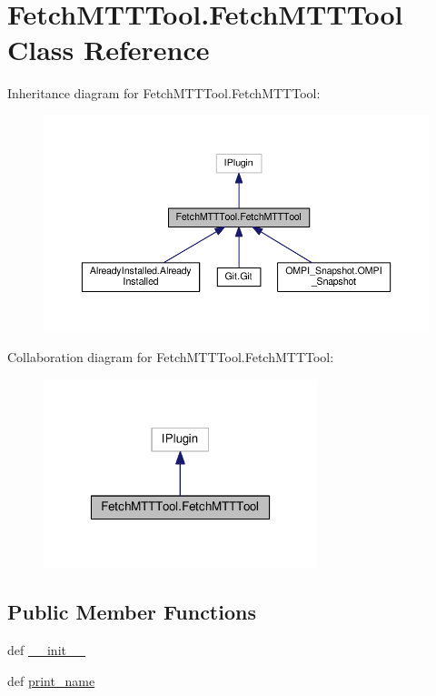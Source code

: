 \hypertarget{classFetchMTTTool_1_1FetchMTTTool}{\section{Fetch\-M\-T\-T\-Tool.\-Fetch\-M\-T\-T\-Tool Class Reference}
\label{classFetchMTTTool_1_1FetchMTTTool}
}


Inheritance diagram for Fetch\-M\-T\-T\-Tool.\-Fetch\-M\-T\-T\-Tool\-:
\nopagebreak
\begin{figure}[H]
\begin{center}
\leavevmode
\includegraphics[width=350pt]{classFetchMTTTool_1_1FetchMTTTool__inherit__graph}
\end{center}
\end{figure}


Collaboration diagram for Fetch\-M\-T\-T\-Tool.\-Fetch\-M\-T\-T\-Tool\-:
\nopagebreak
\begin{figure}[H]
\begin{center}
\leavevmode
\includegraphics[width=226pt]{classFetchMTTTool_1_1FetchMTTTool__coll__graph}
\end{center}
\end{figure}
\subsection*{Public Member Functions}
\begin{DoxyCompactItemize}
\item 
def \hyperlink{classFetchMTTTool_1_1FetchMTTTool_ac23a2c73d6f9eb2edcd7fcdae09c7b8c}{\-\_\-\-\_\-init\-\_\-\-\_\-}
\item 
def \hyperlink{classFetchMTTTool_1_1FetchMTTTool_a9b335ae2c3b15ef427fc70aa0510ae40}{print\-\_\-name}
\end{DoxyCompactItemize}


